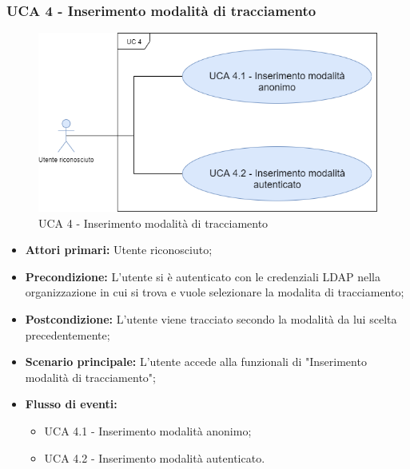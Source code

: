 \newpage
\subsubsection{UCA 4 - Inserimento modalità di tracciamento}%

\begin{figure}[h]
	\centering	
	\includegraphics[scale=0.53]{sezioni/UseCase/Immagini/UCA4.png}
	\caption{UCA 4 - Inserimento modalità di tracciamento}
\end{figure}

\begin{itemize}
	\item \textbf{Attori primari:} Utente riconosciuto;
	\item \textbf{Precondizione:} L'utente si è autenticato con le credenziali LDAP nella organizzazione in cui si trova e vuole selezionare la modalita di tracciamento;
	\item \textbf{Postcondizione:} L'utente viene tracciato secondo la modalità da lui scelta precedentemente; 
	\item \textbf{Scenario principale:} L'utente accede alla funzionali di "Inserimento modalità di tracciamento";
	\item \textbf{Flusso di eventi:}
	\begin{itemize}
		\item UCA 4.1 - Inserimento modalità anonimo;
		\item UCA 4.2 - Inserimento modalità autenticato.
	\end{itemize}
\end{itemize}

